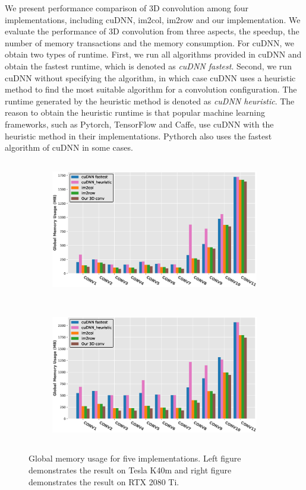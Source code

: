 We present performance comparison of 3D convolution among four implementations, including cuDNN, im2col, im2row and our implementation. We
evaluate the performance of 3D convolution from three aspects, the speedup, the number of memory transactions and the memory consumption.
For cuDNN, we obtain two types of runtime. First, we run all algorithms provided in cuDNN and obtain the fastest runtime, which is denoted
as \emph{cuDNN fastest}. Second, we run cuDNN without specifying the algorithm, in which case cuDNN uses a heuristic method to find the
most suitable algorithm for a convolution configuration. The runtime generated by the heuristic method is denoted as \emph{cuDNN
heuristic}. The reason to obtain the heuristic runtime is that popular machine learning frameworks, such as Pytorch, TensorFlow and Caffe,
use cuDNN with  the heuristic method in their implementations. Pythorch also uses the fastest algorithm of cuDNN in some cases.

\begin{figure}
	
	\begin{subfigure}{\columnwidth}
		\centering
		 \includegraphics[width=\columnwidth,height=6cm]{./figure/mem3d_1.eps}
		 \label{fig:3dmemk40m}
	\end{subfigure}
	\begin{subfigure}{\columnwidth}
		\centering
		 \includegraphics[width=\columnwidth,height=6cm]{./figure/mem3d_1_rtx2080.eps}
		 \label{fig:3dmemrtx2080}
	\end{subfigure}
	\caption{Global memory usage for five implementations. Left figure demonstrates the result on Tesla K40m and right figure demonstrates the result on RTX 2080 Ti.}
	\label{fig:3dmem}
\end{figure}

